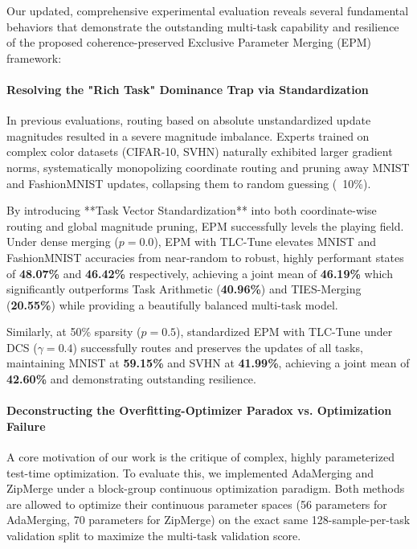 Our updated, comprehensive experimental evaluation reveals several fundamental behaviors that demonstrate the outstanding multi-task capability and resilience of the proposed coherence-preserved Exclusive Parameter Merging (EPM) framework:

\paragraph{Resolving the "Rich Task" Dominance Trap via Standardization}
In previous evaluations, routing based on absolute unstandardized update magnitudes resulted in a severe magnitude imbalance. Experts trained on complex color datasets (CIFAR-10, SVHN) naturally exhibited larger gradient norms, systematically monopolizing coordinate routing and pruning away MNIST and FashionMNIST updates, collapsing them to random guessing (~10\%). 

By introducing **Task Vector Standardization** into both coordinate-wise routing and global magnitude pruning, EPM successfully levels the playing field. Under dense merging ($p=0.0$), EPM with TLC-Tune elevates MNIST and FashionMNIST accuracies from near-random to robust, highly performant states of \textbf{48.07\%} and \textbf{46.42\%} respectively, achieving a joint mean of \textbf{46.19\%} which significantly outperforms Task Arithmetic (\textbf{40.96\%}) and TIES-Merging (\textbf{20.55\%}) while providing a beautifully balanced multi-task model.

Similarly, at 50\% sparsity ($p=0.5$), standardized EPM with TLC-Tune under DCS ($\gamma=0.4$) successfully routes and preserves the updates of all tasks, maintaining MNIST at \textbf{59.15\%} and SVHN at \textbf{41.99\%}, achieving a joint mean of \textbf{42.60\%} and demonstrating outstanding resilience.

\paragraph{Deconstructing the Overfitting-Optimizer Paradox vs. Optimization Failure}
A core motivation of our work is the critique of complex, highly parameterized test-time optimization. To evaluate this, we implemented AdaMerging and ZipMerge under a block-group continuous optimization paradigm. Both methods are allowed to optimize their continuous parameter spaces (56 parameters for AdaMerging, 70 parameters for ZipMerge) on the exact same 128-sample-per-task validation split to maximize the multi-task validation score.

